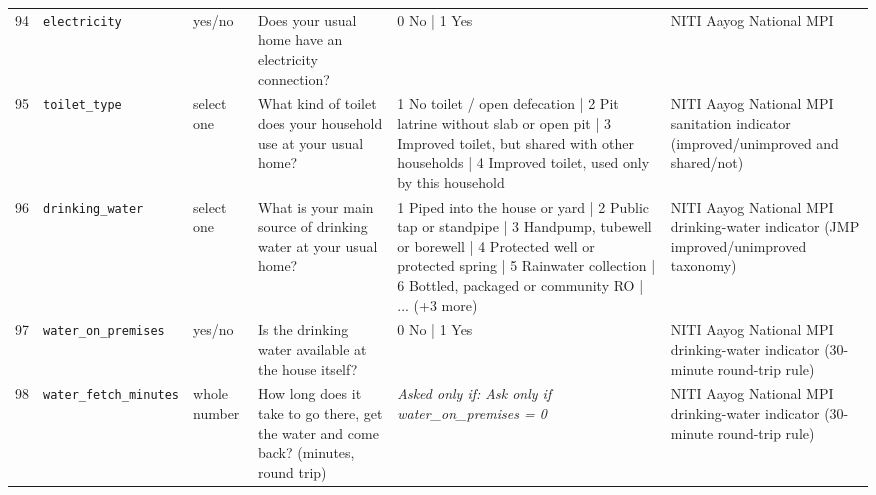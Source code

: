 \documentclass[9pt,a4paper,landscape]{article}
\begin{document}
\begin{longtable}{@{}p{0.5cm}p{3.3cm}p{1.7cm}p{7.3cm}p{5.6cm}p{5.4cm}@{}}
\footnotesize 94 & \footnotesize\texttt{electricity} & \scriptsize yes/no & \footnotesize Does your usual home have an electricity connection?\par\vspace{1pt}{\footnotesize\color{hdr}{\hifont क्या आपके असली घर में बिजली का कनेक्शन है?}} & \scriptsize 0 No | 1 Yes & \scriptsize NITI Aayog National MPI\\
\footnotesize 95 & \footnotesize\texttt{toilet\_type} & \scriptsize select one & \footnotesize What kind of toilet does your household use at your usual home?\par\vspace{1pt}{\footnotesize\color{hdr}{\hifont आपका घर अपने असली घर में किस तरह का शौचालय इस्तेमाल करता है?}} & \scriptsize 1 No toilet / open defecation | 2 Pit latrine without slab or open pit | 3 Improved toilet, but shared with other households | 4 Improved toilet, used only by this household & \scriptsize NITI Aayog National MPI sanitation indicator (improved/unimproved and shared/not)\\
\footnotesize 96 & \footnotesize\texttt{drinking\_water} & \scriptsize select one & \footnotesize What is your main source of drinking water at your usual home?\par\vspace{1pt}{\footnotesize\color{hdr}{\hifont आपके असली घर में पीने का पानी मुख्य रूप से कहाँ से आता है?}} & \scriptsize 1 Piped into the house or yard | 2 Public tap or standpipe | 3 Handpump, tubewell or borewell | 4 Protected well or protected spring | 5 Rainwater collection | 6 Bottled, packaged or community RO | ... (+3 more) & \scriptsize NITI Aayog National MPI drinking-water indicator (JMP improved/unimproved taxonomy)\\
\footnotesize 97 & \footnotesize\texttt{water\_on\_premises} & \scriptsize yes/no & \footnotesize Is the drinking water available at the house itself?\par\vspace{1pt}{\footnotesize\color{hdr}{\hifont क्या पीने का पानी घर पर ही मिल जाता है?}} & \scriptsize 0 No | 1 Yes & \scriptsize NITI Aayog National MPI drinking-water indicator (30-minute round-trip rule)\\
\footnotesize 98 & \footnotesize\texttt{water\_fetch\_minutes} & \scriptsize whole number & \footnotesize How long does it take to go there, get the water and come back? (minutes, round trip)\par\vspace{1pt}{\footnotesize\color{hdr}{\hifont वहाँ जाने, पानी भरने और लौटने में कुल कितना समय लगता है? (मिनट)}} & \scriptsize \textit{Asked only if: Ask only if water\_on\_premises = 0} & \scriptsize NITI Aayog National MPI drinking-water indicator (30-minute round-trip rule)\\

\end{longtable}
\end{document}
